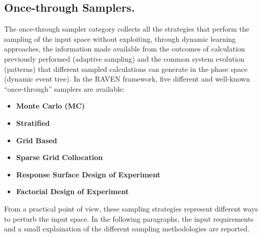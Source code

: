 \subsection{Once-through Samplers.}
\label{subsec:onceThroughSamplers}
The once-through sampler category collects all the strategies that perform the sampling of the input space without exploiting, through dynamic learning approaches, the information made available from the outcomes of calculation previously performed (adaptive sampling) and the common system evolution (patterns) that different sampled calculations can generate in the phase space (dynamic event tree). 
In the RAVEN framework, five different and well-known “once-through” samplers are available: 
\begin{itemize}
\item \textbf{Monte Carlo (MC)}
\item \textbf{Stratified}
\item \textbf{Grid Based}
\item \textbf{Sparse Grid Collocation}
\item \textbf{Response Surface Design of Experiment}
\item \textbf{Factorial Design of Experiment}
\end{itemize}
From a practical point of view, these sampling strategies represent different ways to perturb the input space. In the following paragraphs, the input requirements and a small explaination of the different sampling methodologies are reported.
